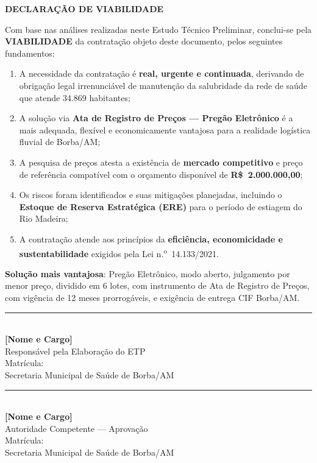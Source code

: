\documentclass[12pt,a4paper]{article}
\begin{document}
\begin{conclusabox}
\begin{center}
  \textbf{\color{navyblue}\large DECLARAÇÃO DE VIABILIDADE}
\end{center}

\medskip
Com base nas análises realizadas neste Estudo Técnico Preliminar, conclui-se pela
\textbf{VIABILIDADE} da contratação objeto deste documento, pelos seguintes fundamentos:

\begin{enumerate}
  \item A necessidade da contratação é \textbf{real, urgente e continuada},
    derivando de obrigação legal irrenunciável de manutenção da salubridade da rede
    de saúde que atende 34.869 habitantes;
  \item A solução via \textbf{Ata de Registro de Preços --- Pregão Eletrônico} é a
    mais adequada, flexível e economicamente vantajosa para a realidade logística
    fluvial de Borba/AM;
  \item A pesquisa de preços atesta a existência de \textbf{mercado competitivo}
    e preço de referência compatível com o orçamento disponível de
    \textbf{R\$~2.000.000,00};
  \item Os riscos foram identificados e suas mitigações planejadas,
    incluindo o \textbf{Estoque de Reserva Estratégica (ERE)} para o período
    de estiagem do Rio Madeira;
  \item A contratação atende aos princípios da \textbf{eficiência, economicidade e
    sustentabilidade} exigidos pela Lei n.\textsuperscript{o}~14.133/2021.
\end{enumerate}

\medskip
\textbf{Solução mais vantajosa}: Pregão Eletrônico, modo aberto, julgamento por menor
preço, dividido em 6 lotes, com instrumento de Ata de Registro de Preços, com vigência
de 12 meses prorrogáveis, e exigência de entrega CIF Borba/AM.
\end{conclusabox}

\vspace{1.5cm}

\noindent
\begin{minipage}{0.47\linewidth}
\centering
\rule{6cm}{0.5pt}\\[4pt]
\textbf{[Nome e Cargo]}\\
Responsável pela Elaboração do ETP\\
Matrícula: \hspace{2cm}\\[2pt]
{\small Secretaria Municipal de Saúde de Borba/AM}
\end{minipage}
\hfill
\begin{minipage}{0.47\linewidth}
\centering
\rule{6cm}{0.5pt}\\[4pt]
\textbf{[Nome e Cargo]}\\
Autoridade Competente --- Aprovação\\
Matrícula: \hspace{2cm}\\[2pt]
{\small Secretaria Municipal de Saúde de Borba/AM}
\end{minipage}
\end{document}
